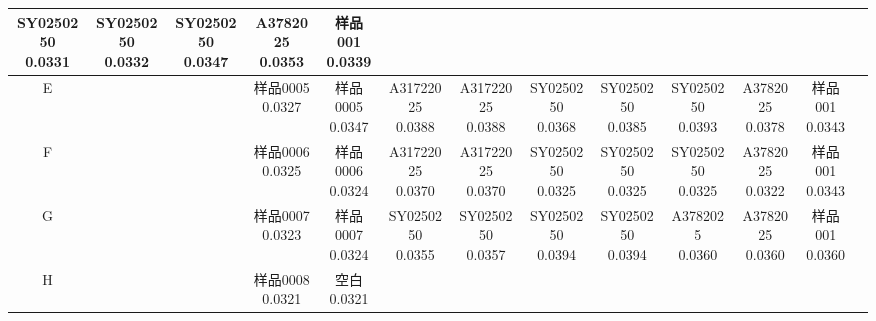 \documentclass[UTF8,10pt,a4paper,fontset=fandol]{ctexart}
\begin{document}
\begin{center}
\begin{tabular}{|c|c|c|c|c|c|c|c|c|c|c|c|c|}
\shortstack{SY0250250\\0.0331} & \shortstack{SY0250250\\0.0332} &
\shortstack{SY0250250\\0.0347} & \shortstack{A3782025\\0.0353} &
\shortstack{样品001\\0.0339} & \\
\hline
E & & & \shortstack{样品0005\\0.0327} & \shortstack{样品0005\\0.0347} &
\shortstack{A31722025\\0.0388} & \shortstack{A31722025\\0.0388} &
\shortstack{SY0250250\\0.0368} & \shortstack{SY0250250\\0.0385} &
\shortstack{SY0250250\\0.0393} & \shortstack{A3782025\\0.0378} &
\shortstack{样品001\\0.0343} & \\
\hline
F & & & \shortstack{样品0006\\0.0325} & \shortstack{样品0006\\0.0324} &
\shortstack{A31722025\\0.0370} & \shortstack{A31722025\\0.0370} &
\shortstack{SY0250250\\0.0325} & \shortstack{SY0250250\\0.0325} &
\shortstack{SY0250250\\0.0325} & \shortstack{A3782025\\0.0322} &
\shortstack{样品001\\0.0343} & \\
\hline
G & & & \shortstack{样品0007\\0.0323} & \shortstack{样品0007\\0.0324} &
\shortstack{SY0250250\\0.0355} & \shortstack{SY0250250\\0.0357} &
\shortstack{SY0250250\\0.0394} & \shortstack{SY0250250\\0.0394} &
\shortstack{A3782025\\0.0360} & \shortstack{A3782025\\0.0360} &
\shortstack{样品001\\0.0360} & \\
\hline
H & & & \shortstack{样品0008\\0.0321} & \shortstack{空白\\0.0321} &

\end{tabular}
\end{center}
\end{document}
